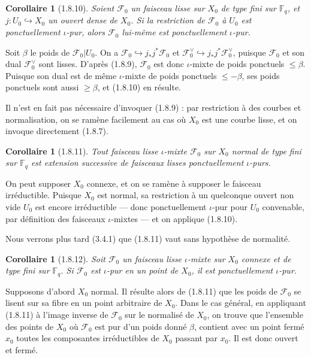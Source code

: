 \documentclass[12pt,a4paper]{article}
\theoremstyle{plain}
\newtheorem{corollary}[theorem]{Corollaire}
\theoremstyle{definition}
\theoremstyle{remark}
\newcommand{\FF}{{\mathbb{F}}}
\begin{document}
\setcounter{section}{1}



\begin{corollary}[1.8.10]
Soient $\mathscr{F}_0$ un faisceau lisse sur $X_0$ de type fini sur $\FF_q$, et $j : U_0 \hookrightarrow X_0$ un ouvert dense de $X_0$. Si la restriction de $\mathscr{F}_0$ \`a $U_0$ est ponctuellement $\iota$-pur, alors $\mathscr{F}_0$ lui-m\^eme est ponctuellement $\iota$-pur.
\end{corollary}

Soit $\beta$ le poids de $\mathscr{F}_0|U_0$. On a $\mathscr{F}_0 \hookrightarrow j_*j^*\mathscr{F}_0$ et $\mathscr{F}_0^\vee \hookrightarrow j_*j^*\mathscr{F}_0^\vee$, puisque $\mathscr{F}_0$ et son dual $\mathscr{F}_0^\vee$ sont lisses. D'apr\`es (1.8.9), $\mathscr{F}_0$ est donc $\iota$-mixte de poids ponctuels $\leq \beta$. Puisque son dual est de m\^eme $\iota$-mixte de poids ponctuels $\leq -\beta$, ses poids ponctuels sont aussi $\geq \beta$, et (1.8.10) en r\'esulte.

Il n'est en fait pas n\'ecessaire d'invoquer (1.8.9) : par restriction \`a des courbes et normalisation, on se ram\`ene facilement au cas o\`u $X_0$ est une courbe lisse, et on invoque directement (1.8.7).

\begin{corollary}[1.8.11]
Tout faisceau lisse $\iota$-mixte $\mathscr{F}_0$ sur $X_0$ normal de type fini sur $\FF_q$ est extension successive de faisceaux lisses ponctuellement $\iota$-purs.
\end{corollary}

On peut supposer $X_0$ connexe, et on se ram\`ene \`a supposer le faisceau irr\'eductible. Puisque $X_0$ est normal, sa restriction \`a un quelconque ouvert non vide $U_0$ est encore irr\'eductible --- donc ponctuellement $\iota$-pur pour $U_0$ convenable, par d\'efinition des faisceaux $\iota$-mixtes --- et on applique (1.8.10).

Nous verrons plus tard (3.4.1) que (1.8.11) vaut sans hypoth\`ese de normalit\'e.

\begin{corollary}[1.8.12]
Soit $\mathscr{F}_0$ un faisceau lisse $\iota$-mixte sur $X_0$ connexe et de type fini sur $\FF_q$. Si $\mathscr{F}_0$ est $\iota$-pur en un point de $X_0$, il est ponctuellement $\iota$-pur.
\end{corollary}

Supposons d'abord $X_0$ normal. Il r\'esulte alors de (1.8.11) que les poids de $\mathscr{F}_0$ se lisent sur sa fibre en un point arbitraire de $X_0$. Dans le cas g\'en\'eral, en appliquant (1.8.11) \`a l'image inverse de $\mathscr{F}_0$ sur le normalis\'e de $X_0$, on trouve que l'ensemble des points de $X_0$ o\`u $\mathscr{F}_0$ est pur d'un poids donn\'e $\beta$, contient avec un point ferm\'e $x_0$ toutes les composantes irr\'eductibles de $X_0$ passant par $x_0$. Il est donc ouvert et ferm\'e.
\end{document}
